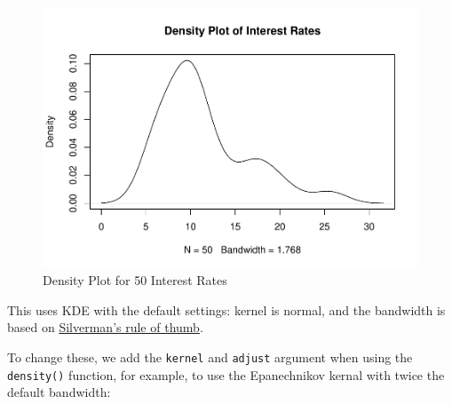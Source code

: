 \documentclass[
]{book}
\newenvironment{Shaded}{\begin{snugshade}}{\end{snugshade}}
\newcommand{\AttributeTok}[1]{\textcolor[rgb]{0.13,0.29,0.53}{#1}}
\newcommand{\DecValTok}[1]{\textcolor[rgb]{0.00,0.00,0.81}{#1}}
\newcommand{\DocumentationTok}[1]{\textcolor[rgb]{0.56,0.35,0.01}{\textbf{\textit{#1}}}}
\newcommand{\FunctionTok}[1]{\textcolor[rgb]{0.13,0.29,0.53}{\textbf{#1}}}
\newcommand{\NormalTok}[1]{#1}
\newcommand{\SpecialCharTok}[1]{\textcolor[rgb]{0.81,0.36,0.00}{\textbf{#1}}}
\newcommand{\StringTok}[1]{\textcolor[rgb]{0.31,0.60,0.02}{#1}}
\begin{document}
\begin{figure}
\centering
\includegraphics{bookdown-demo_files/figure-latex/4-R-1.pdf}
\caption{\label{fig:4-R}Density Plot for 50 Interest Rates}
\end{figure}

This uses KDE with the default settings: kernel is normal, and the bandwidth is based on \href{https://en.wikipedia.org/wiki/Kernel_density_estimation\#A_rule-of-thumb_bandwidth_estimator}{Silverman's rule of thumb}.

To change these, we add the \texttt{kernel} and \texttt{adjust} argument when using the \texttt{density()} function, for example, to use the Epanechnikov kernal with twice the default bandwidth:

\begin{Shaded}
\end{Shaded}
\end{document}

